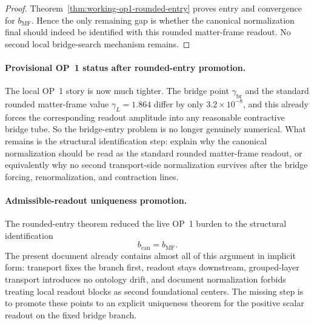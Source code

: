 \begin{proof}
Theorem~\ref{thm:working-op1-rounded-entry} proves entry and convergence for \(b_{\mathrm{MF}}\). Hence the only remaining gap is whether the canonical normalization final should indeed be identified with this rounded matter-frame readout. No second local bridge-search mechanism remains.
\end{proof}

\paragraph{Provisional OP~1 status after rounded-entry promotion.}
The local OP~1 story is now much tighter. The bridge point \(\gamma_{\mathrm{br}}\) and the standard rounded matter-frame value \(\gamma_L=1.864\) differ by only \(3.2\times 10^{-8}\), and this already forces the corresponding readout amplitude into any reasonable contractive bridge tube. So the bridge-entry problem is no longer genuinely numerical. What remains is the structural identification step: explain why the canonical normalization should be read as the standard rounded matter-frame readout, or equivalently why no second transport-side normalization survives after the bridge forcing, renormalization, and contraction lines.


\paragraph{Admissible-readout uniqueness promotion.}
The rounded-entry theorem reduced the live OP~1 burden to the structural identification
\[
 b_{\mathrm{can}}=b_{\mathrm{MF}}.
\]
The present document already contains almost all of this argument in implicit form: transport fixes the branch first, readout stays downstream, grouped-layer transport introduces no ontology drift, and document normalization forbids treating local readout blocks as second foundational centers. The missing step is to promote these points to an explicit uniqueness theorem for the positive scalar readout on the fixed bridge branch.

